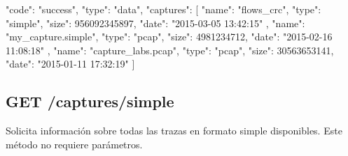 \begin{itemize}
{\begin{minipage}{\textwidth}
\begin{code}[language=json]
{
  "code": "success",
  "type": "data",
  "captures": [
    {
      "name": "flows_crc",
      "type": "simple",
      "size": 956092345897,
      "date": "2015-03-05 13:42:15"
    },
    {
      "name": "my_capture.simple",
      "type": "pcap",
      "size": 4981234712,
      "date": "2015-02-16 11:08:18"
    },
    {
      "name": "capture_labs.pcap",
      "type": "pcap",
      "size": 30563653141,
      "date": "2015-01-11 17:32:19"
    }
  ]
}
\end{code}
\end{minipage}
}

\end{itemize}

%
%
\subsection{GET /captures/simple}
Solicita información sobre todas las \glspl{traza} en formato \gls{simple} disponibles. Este método no requiere parámetros.

